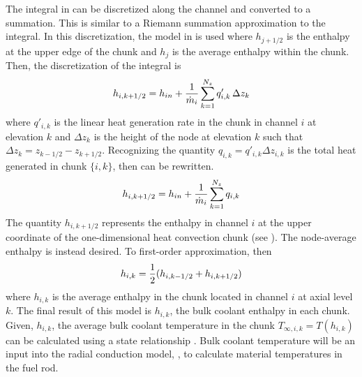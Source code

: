     The integral in  can be discretized along
    the channel and converted to a summation. This is similar to a Riemann
    summation approximation to the integral. In this discretization, the model
    in  is used where $h_{j+1/2}$ is the enthalpy at the
    upper edge of the chunk and $h_j$ is the average enthalpy within the chunk.
    Then, the discretization of the integral 
    is 
    \begin{equation}
      \label{eq:heat_balance}
      h_{i,k+1/2} = 
        h_{in} + \frac{1}{\dot{m}_i} \sum_{k=1}^{N_z} q'_{i,k} \, \Delta z_{k}
    \end{equation}
    where $q'_{i,k}$ is the linear heat generation rate in the chunk in channel
    $i$ at elevation $k$ and $\Delta z_k$ is the height of the node at elevation
    $k$ such that ${\Delta z_{k} = z_{k-1/2} - z_{k+1/2}}$. 
    Recognizing the quantity $q_{i,k} = q'_{i,k} \Delta z_{i,k}$ is the total
    heat generated in chunk $\{i,k\}$, then  can be
    rewritten.
    \begin{equation}
      h_{i,k+1/2} = h_{in} + \frac{1}{\dot{m}_i} \sum_{k=1}^{N_z} q_{i,k}
    \end{equation}
    The quantity $h_{i,k+1/2}$ represents the enthalpy in channel $i$ at the 
    upper coordinate of the one-dimensional heat convection chunk (see
    ). The node-average enthalpy is instead desired. To 
    first-order approximation, then
    \begin{equation}
      h_{i,k} = \frac{1}{2} (h_{i,k-1/2}+h_{i,k+1/2})
    \end{equation}
    where $h_{i,k}$ is the average enthalpy in the chunk located in channel $i$
    at axial level $k$. The final result of this model is $h_{i,k}$, the bulk 
    coolant enthalpy in each chunk. Given, $h_{i,k}$, the average bulk coolant 
    temperature in the chunk $T_{\infty,i,k} = T(h_{i,k})$ can be calculated 
    using a state relationship \cite{sodiumProp}. Bulk coolant temperature 
    will be an input into the radial conduction model, 
    , to calculate material temperatures in 
    the fuel rod.
  
